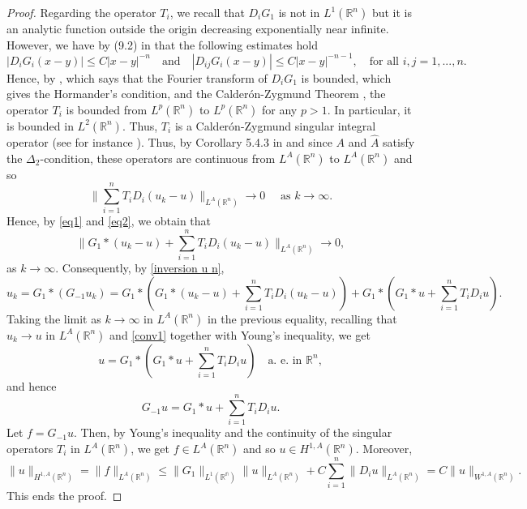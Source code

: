\documentclass[leqno,twoside, 12pt]{amsart}
\theoremstyle{plain}
\numberwithin{equation}{section} \numberwithin{figure}{section}
\theoremstyle{definition}
\newcommand{\R}{\mathbb R}
\numberwithin{equation}{section}
\begin{document}
\begin{proof}
Regarding the operator $T_i$, we recall that $D_iG_1$ is not in $L^1(\mathbb{R}^n)$ but it is an analytic function outside the origin  decreasing exponentially near infinite.
However, we have by (9.2) in \cite{AS} that the following estimates hold
$$|D_iG_i(x-y)|\leq C|x-y|^{-n} \quad \text{and}\quad|D_{ij}G_i(x-y)|\leq C|x-y|^{-n-1}, \quad \text{for all }i, j=1, ..., n.$$Hence, by \cite[Eq. (5.7)]{AS}, \cite[Eq. (5.6)]{AS} which says that the Fourier transform of $D_iG_1$ is bounded, \cite[Prop. 5.2]{D} which gives the Hormander's condition, and the Calder\'on-Zygmund Theorem  \cite[Theorem 5.1]{D}, the operator $T_i$ is bounded from $L^p(\R^n)$ to $L^p(\R^n)$ for any $p>1$. In particular, it is bounded in $L^2(\R^n)$. Thus, $T_i$ is a Calder\'on-Zygmund singular integral operator (see for instance \cite[page 115]{HH}). Thus, by Corollary 5.4.3 in \cite{HH} and since $A$ and $\hat A$ satisfy the $\Delta_2$-condition, these operators are continuous from $L^A(\mathbb{R}^n)$ to $L^A(\mathbb{R}^n)$ and so  
\begin{equation}\label{eq2}
 \bigg\|\sum_{i=1}^n T_iD_i(u_k-u)\bigg\|_{L^A(\mathbb{R}^n)}\to 0 \quad \text{ as }k\to \infty.
\end{equation}Hence, by \eqref{eq1} and \eqref{eq2}, we obtain  that
\begin{equation}\label{conv1}
 \bigg\|G_1*(u_k-u) + \sum_{i=1}^n T_iD_i(u_k-u)\bigg\|_{L^A(\mathbb{R}^n)}\to 0,
\end{equation}as $k\to \infty$. Consequently, by \eqref{inversion u n}, 
\begin{equation}
u_k= G_1*(G_{-1}u_k) = G_1*\left(G_1*(u_k-u)+\sum_{i=1}^nT_iD_i(u_k-u)\right) + G_1*\left(G_1*u+\sum_{i=1}^nT_iD_iu\right).
\end{equation}Taking the limit as $k\to \infty$ in $L^A(\mathbb{R}^n)$ in the previous equality, recalling that $u_k\to u$ in $L^A(\mathbb{R}^n)$ and \eqref{conv1} together with Young's inequality, we get
$$u= G_1*\left(G_1*u+\sum_{i=1}^nT_iD_iu\right) \quad \text{a. e. in }\mathbb{R}^n,$$and hence 
$$G_{-1}u = G_1*u+\sum_{i=1}^nT_iD_iu.$$Let $f=G_{-1}u$.  Then, by Young's inequality and the continuity of the singular operators $T_i$ in $L^A(\mathbb{R}^n)$, we get $f\in L^A(\mathbb{R}^n)$ and so $u\in H^{1, A}(\mathbb{R}^n)$. Moreover,
$$\|u\|_{H^{1, A}(\mathbb{R}^n)} = \|f\|_{L^A(\mathbb{R}^n)}\leq \|G_1\|_{L^1(\mathbb{R^n})}\|u\|_{L^A(\mathbb{R}^n)}+C\sum_{i=1}^n\|D_iu\|_{L^A(\mathbb{R}^n)}=C\|u\|_{W^{1, A}(\mathbb{R}^n)}.$$This ends the proof. 
\end{proof}
\end{document}

